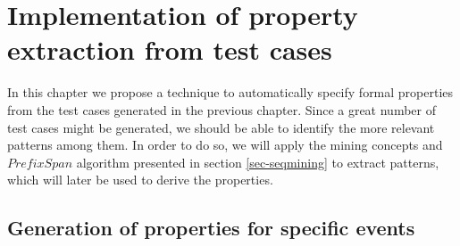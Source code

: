 \chapter{Implementation of property extraction from test cases}
\label{cap:propextract}

In this chapter we propose a technique to automatically specify formal properties from the test cases generated in the previous chapter. Since a great number of test cases might be generated, we should be able to identify the more relevant patterns among them. In order to do so, we will apply the mining concepts and $PrefixSpan$ algorithm presented in section \ref{sec-seqmining} to extract patterns, which will later be used to derive the properties.



%


%







\section{Generation of properties for specific events}
